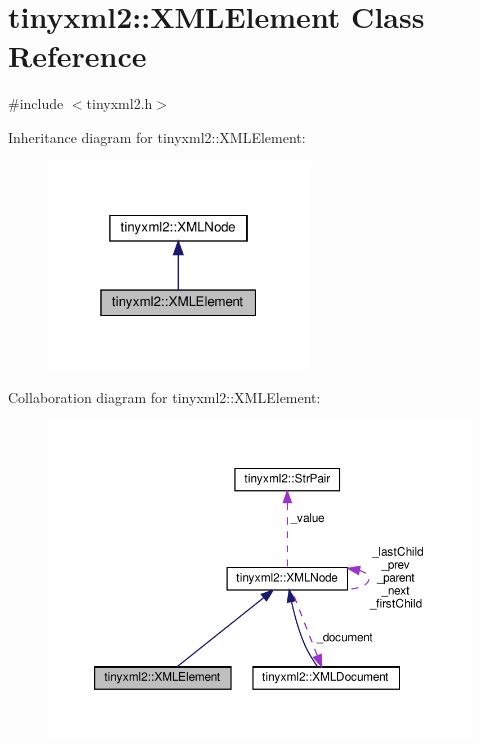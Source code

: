 \hypertarget{classtinyxml2_1_1_x_m_l_element}{}\section{tinyxml2\+:\+:X\+M\+L\+Element Class Reference}
\label{classtinyxml2_1_1_x_m_l_element}


{\ttfamily \#include $<$tinyxml2.\+h$>$}



Inheritance diagram for tinyxml2\+:\+:X\+M\+L\+Element\+:
\nopagebreak
\begin{figure}[H]
\begin{center}
\leavevmode
\includegraphics[width=196pt]{classtinyxml2_1_1_x_m_l_element__inherit__graph}
\end{center}
\end{figure}


Collaboration diagram for tinyxml2\+:\+:X\+M\+L\+Element\+:
\nopagebreak
\begin{figure}[H]
\begin{center}
\leavevmode
\includegraphics[width=350pt]{classtinyxml2_1_1_x_m_l_element__coll__graph}
\end{center}
\end{figure}
